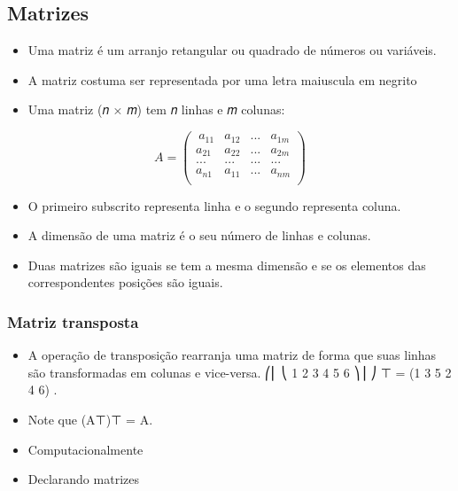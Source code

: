 \documentclass[
]{article}
\providecommand{\tightlist}{%
  \setlength{\itemsep}{0pt}\setlength{\parskip}{0pt}}
\begin{document}
\hypertarget{matrizes}{%
\subsection{Matrizes}\label{matrizes}}

\begin{itemize}
\item
  Uma matriz é um arranjo retangular ou quadrado de números ou
  variáveis.
\item
  A matriz costuma ser representada por uma letra maiuscula em negrito
\item
  Uma matriz (𝑛 × 𝑚) tem 𝑛 linhas e 𝑚 colunas:
\end{itemize}

\[A = \begin{pmatrix}\
a_{11} & a_{12} & ... & a_{1m}\\
a_{21} & a_{22} & ... & a_{2m}\\
... & ... & ... & ... \\
a_{n1} & a_{11} & ... & a_{nm}\\
\end{pmatrix}\]

\begin{itemize}
\tightlist
\item
  O primeiro subscrito representa linha e o segundo representa coluna.
\item
  A dimensão de uma matriz é o seu número de linhas e colunas.
\item
  Duas matrizes são iguais se tem a mesma dimensão e se os elementos das
  correspondentes posições são iguais.
\end{itemize}

\hypertarget{matriz-transposta}{%
\subsubsection{Matriz transposta}\label{matriz-transposta}}

\begin{itemize}
\tightlist
\item
  A operação de transposição rearranja uma matriz de forma que suas
  linhas são transformadas em colunas e vice-versa. ⎛⎜ ⎝ 1 2 3 4 5 6 ⎞⎟
  ⎠ ⊤ = (1 3 5 2 4 6) .
\item
  Note que (A⊤)⊤ = A.
\item
  Computacionalmente
\item
  Declarando matrizes
\end{itemize}
\end{document}
